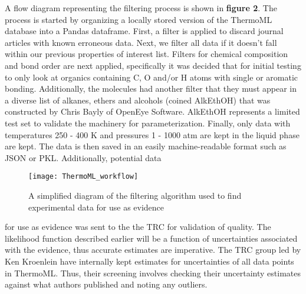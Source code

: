 \documentclass[rmp,nofootinbib,superscriptaddress,12pt,tightenlines,notitlepage]{revtex4-1}
\begin{document}
A flow diagram representing the filtering process is shown in \textbf{figure 2}. The process is started by organizing a locally stored version of the 
ThermoML database into a Pandas dataframe. First, a filter is applied to discard journal articles with known erroneous data. Next, we filter all data if it doesn't 
fall within our previous properties of interest list. Filters for chemical composition and bond order are next applied, specifically it was decided that for initial 
testing to only look at organics containing C, O and/or H atoms with single or aromatic bonding. Additionally, the molecules had another filter that they must appear
in a diverse list of alkanes, ethers and alcohols (coined AlkEthOH) that was constructed by Chris Bayly of OpenEye Software. AlkEthOH represents a limited test set
to validate the machinery for parameterization. Finally, only data with temperatures  
250 - 400 K and pressures 1 - 1000 atm are kept in the liquid phase are kept. The data is then saved in an easily machine-readable format such as JSON or PKL. Additionally, potential data 
\begin{wrapfigure}[13]{r}{0.5\textwidth}
 \centering
 \texttt{[image: ThermoML\_workflow]}
 \caption{A simplified diagram of the filtering algorithm used to find experimental data for use as evidence}
\end{wrapfigure}
for use as evidence was sent to the the TRC for validation of quality. The likelihood function described earlier will be a function of uncertainties associated
with the evidence, thus accurate estimates are imperative. The TRC group led by Ken Kroenlein have internally kept estimates for uncertainties of all data points
in ThermoML. Thus, their screening involves checking their uncertainty estimates against what authors published and noting any outliers. 
\end{document}

